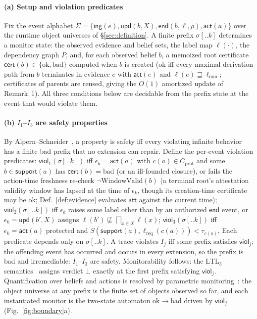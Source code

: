 \documentclass[conference]{IEEEtran}
\newcommand{\Ione}{\ensuremath{I_1}}
\newcommand{\Ithree}{\ensuremath{I_3}}
\newcommand{\att}{\ensuremath{\mathsf{att}}}
\newcommand{\cert}{\ensuremath{\mathsf{cert}}}
\newcommand{\support}{\ensuremath{\mathsf{support}}}
\newcommand{\ev}[1]{\ensuremath{\mathsf{#1}}}
\newcommand{\lmin}{\ensuremath{\ell_{\min}}}
\newcommand{\lreq}{\ensuremath{\ell_{\mathrm{req}}}}
\newcommand{\Cprot}{\ensuremath{C_{\mathrm{prot}}}}
\begin{document}
\paragraph{(a) Setup and violation predicates}
Fix the event alphabet
$\Sigma = \{\ev{ing}(e), \ev{upd}(b, X), \ev{end}(b, \ell, \rho), \ev{act}(a)\}$
over the runtime object universes of \S\ref{sec:definition}. A
finite prefix $\sigma[..k]$ determines a monitor state: the
observed evidence and belief sets, the label map $\ell(\cdot)$,
the dependency graph $P$, and, for each observed belief $b$, a
memoized root certificate $\cert(b) \in \{\mathrm{ok}, \mathrm{bad}\}$
computed when $b$ is created ($\mathrm{ok}$ iff every maximal
derivation path from $b$ terminates in evidence $e$ with $\att(e)$
and $\ell(e) \sqsupseteq \lmin$; certificates of parents are
reused, giving the $O(1)$ amortized update of Remark~1). All three
conditions below are decidable from the prefix state at the event
that would violate them.

\paragraph{(b) \Ione--\Ithree{} are safety properties}
By Alpern--Schneider~\cite{alpern}, a property is safety iff every
violating infinite behavior has a finite bad prefix that no
extension can repair. Define the per-event violation predicates:
$\mathsf{viol}_1(\sigma[..k])$ iff $\epsilon_k = \ev{act}(a)$ with
$c(a) \in \Cprot$ and some $b \in \support(a)$ has
$\cert(b) = \mathrm{bad}$ (or an ill-founded closure), or fails the
action-time freshness re-check $\neg\mathrm{WindowValid}(b)$ (a
terminal root's attestation validity window has lapsed at the time
of $\epsilon_k$, though its creation-time certificate may be
$\mathrm{ok}$; Def.~\ref{def:evidence} evaluates $\att$ against the
current time);
$\mathsf{viol}_2(\sigma[..k])$ iff $\epsilon_k$ raises some label
other than by an authorized $\ev{end}$ event, or
$\epsilon_k = \ev{upd}(b', X)$ assigns
$\ell(b') \not\sqsubseteq \bigsqcap_{x \in X} \ell(x)$;
$\mathsf{viol}_3(\sigma[..k])$ iff $\epsilon_k = \ev{act}(a)$
protected and $S(\support(a), \lreq(c(a))) < \tau_{c(a)}$. Each
predicate depends only on $\sigma[..k]$. A trace violates $I_j$
iff some prefix satisfies $\mathsf{viol}_j$; the offending event
has occurred and occurs in every extension, so the prefix is bad
and irremediable: \Ione--\Ithree{} are safety. Monitorability
follows: the $\mathrm{LTL}_3$ semantics~\cite{bauer,pnueli}
assigns verdict $\bot$ exactly at the first prefix satisfying
$\mathsf{viol}_j$. Quantification over beliefs and actions is
resolved by parametric monitoring~\cite{mop}: the object universe
at any prefix is the finite set of objects observed so far, and
each instantiated monitor is the two-state automaton
$\mathrm{ok} \to \mathrm{bad}$ driven by $\mathsf{viol}_j$
(Fig.~\ref{fig:boundary}a).
\end{document}
